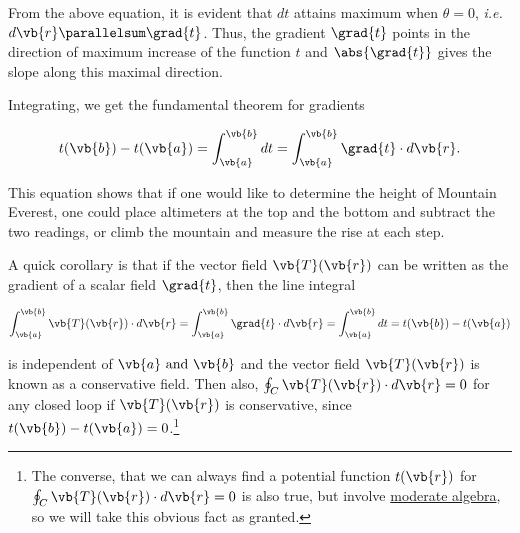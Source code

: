 \documentclass[english,a4paper,12pt]{report}
\begin{document}
From the above equation, it is evident that \(dt\) attains maximum when \(\theta = 0\), \textit{i.e.} \(d\vb{r} \parallelsum \grad{t}\). Thus, the gradient \(\grad{t}\) points in the direction of maximum increase of the function \(t\) and \(\abs{\grad{t}}\) gives the slope along this maximal direction.


	
Integrating, we get the fundamental theorem for gradients

\begin{equation} 
	t(\vb{b}) - t(\vb{a}) = \int_{\vb{a} }^{\vb{b} } dt = \int_{\vb{a}}^{\vb{b}} \grad{t} \cdot d\vb{r}. 
\end{equation}
	
This equation shows that if one would like to determine the height of Mountain Everest, one could place altimeters at the top and the bottom and subtract the two readings, or climb the mountain and measure the rise at each step.

A quick corollary is that if the vector field \(\vb{T} (\vb{r} )\) can be written as the gradient of a scalar field \(\grad{t}  \), then the line integral 

\begin{equation}
	\int_{\vb{a} }^{\vb{b} } \vb{T}(\vb{r} ) \cdot  d\vb{r}  = \int_{\vb{a} }^{\vb{b} } \grad{t} \cdot d\vb{r} = \int_{\vb{a} }^{\vb{b} }dt = t(\vb{b} ) - t(\vb{a} )
\end{equation}

is independent of \(\vb{a} \text { and } \vb{b} \) and the vector field \(\vb{T} (\vb{r} )\) is known as a conservative field. Then also, \(\oint_{C} \vb{T} (\vb{r} ) \cdot d\vb{r} = 0\) for any closed loop if \(\vb{T} (\vb{r} )\) is conservative, since \(t(\vb{b}) - t(\vb{a}) = 0\).\footnote{The converse, that we can always find a potential function \(t(\vb{r} )\) for \(\oint_{C}\vb{T} (\vb{r} )\cdot d\vb{r}  =0\) is also true, but involve \href{https:////www.damtp.cam.ac.uk//user//tong//vc//vc.pdf}{moderate algebra}, so we will take this obvious fact as granted.  } 
\end{document}
